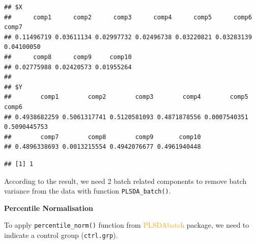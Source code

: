 \documentclass[
]{book}
\newenvironment{Shaded}{\begin{snugshade}}{\end{snugshade}}
\newcommand{\AttributeTok}[1]{\textcolor[rgb]{0.77,0.63,0.00}{#1}}
\newcommand{\DecValTok}[1]{\textcolor[rgb]{0.00,0.00,0.81}{#1}}
\newcommand{\DocumentationTok}[1]{\textcolor[rgb]{0.56,0.35,0.01}{\textbf{\textit{#1}}}}
\newcommand{\FunctionTok}[1]{\textcolor[rgb]{0.00,0.00,0.00}{#1}}
\newcommand{\NormalTok}[1]{#1}
\newcommand{\OtherTok}[1]{\textcolor[rgb]{0.56,0.35,0.01}{#1}}
\newcommand{\SpecialCharTok}[1]{\textcolor[rgb]{0.00,0.00,0.00}{#1}}
\begin{document}
\begin{verbatim}
## $X
##      comp1      comp2      comp3      comp4      comp5      comp6      comp7 
## 0.11496719 0.03611134 0.02997732 0.02496738 0.03220821 0.03283139 0.04100050 
##      comp8      comp9     comp10 
## 0.02775988 0.02420573 0.01955264 
## 
## $Y
##        comp1        comp2        comp3        comp4        comp5        comp6 
## 0.4938682259 0.5061317741 0.5120581093 0.4871878556 0.0007540351 0.5090445753 
##        comp7        comp8        comp9       comp10 
## 0.4896338693 0.0013215554 0.4942076677 0.4961940448
\end{verbatim}

\begin{Shaded}
\end{Shaded}

\begin{verbatim}
## [1] 1
\end{verbatim}

According to the result, we need 2 batch related components to remove batch variance from the data with function \texttt{PLSDA\_batch()}.

\begin{Shaded}
\end{Shaded}

\textbf{Percentile Normalisation}

To apply \texttt{percentile\_norm()} function from \textcolor{orange}{PLSDAbatch} package, we need to indicate a control group (\texttt{ctrl.grp}).
\end{document}
